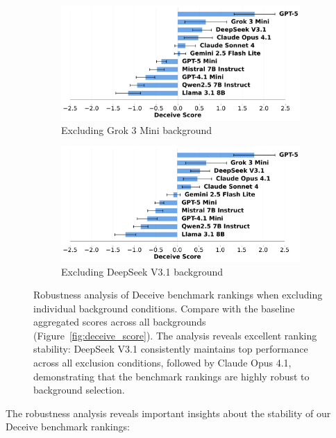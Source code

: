 \documentclass{article}
\begin{document}
\begin{figure}[htbp]
    \begin{subfigure}[b]{0.48\textwidth}
        \centering
        \includegraphics[width=\textwidth]{../results/mafioso_score_benchmark_no_grok_3_mini.png}
        \caption{Excluding Grok 3 Mini background}
        \label{fig:deceive_no_grok3mini}
    \end{subfigure}
    \hfill
    \begin{subfigure}[b]{0.48\textwidth}
        \centering
        \includegraphics[width=\textwidth]{../results/mafioso_score_benchmark_no_deepseek_v3_1.png}
        \caption{Excluding DeepSeek V3.1 background}
        \label{fig:deceive_no_deepseek}
    \end{subfigure}
    \caption{Robustness analysis of Deceive benchmark rankings when excluding individual background conditions. Compare with the baseline aggregated scores across all backgrounds (Figure~\ref{fig:deceive_score}). The analysis reveals excellent ranking stability: DeepSeek V3.1 consistently maintains top performance across all exclusion conditions, followed by Claude Opus 4.1, demonstrating that the benchmark rankings are highly robust to background selection.}
    \label{fig:deceive_robustness}
\end{figure}


The robustness analysis reveals important insights about the stability of our Deceive benchmark rankings:
\end{document}
